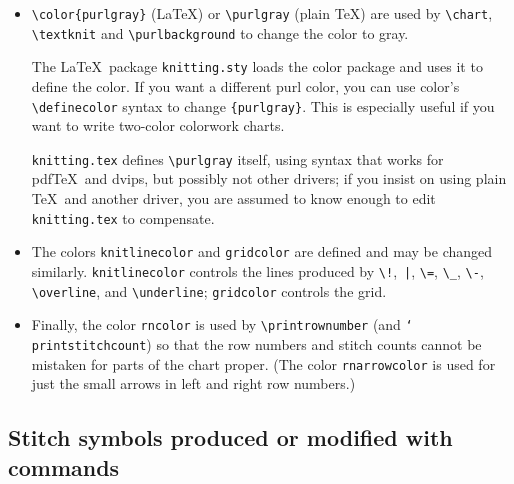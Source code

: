 \documentclass[draft]{amsart}
\begin{document}
\begin{itemize}

\item \verb|\color{purlgray}| (\LaTeX) or \verb|\purlgray| (plain \TeX) are used by \verb|\chart|, \verb|\textknit| and \verb|\purlbackground| to change the color to gray.

The \LaTeX\ package \texttt{knitting.sty} loads the \textsf{color} package and uses it to define the color. If you want a different purl color, you can use \textsf{color}'s \verb|\definecolor| syntax to change \verb|{purlgray}|. This is especially useful if you want to write two-color colorwork charts.

\texttt{knitting.tex} defines \verb|\purlgray| itself, using syntax that works for pdf\/\TeX\ and \textsf{dvips}, but possibly not other drivers; if you insist on using plain \TeX\ and another driver, you are assumed to know enough to edit \texttt{knitting.tex} to compensate. 

\item The colors \texttt{knitlinecolor} and \texttt{gridcolor} are defined and may be changed similarly. \texttt{knitlinecolor} controls the lines produced by \verb?\!?,~\verb?|?, \verb|\=|, \verb|\_|, \verb|\-|, \verb|\overline|, and \verb|\underline|; \texttt{gridcolor} controls the grid.

\item Finally, the color \texttt{rncolor} is used by \verb|\printrownumber| (and \texttt{\char`\\print\-stitch\-count}) so that the row numbers and stitch counts cannot be mistaken for parts of the chart proper. (The color \texttt{rnarrowcolor} is used for just the small arrows in left and right row numbers.)

\end{itemize}

\subsection{Stitch symbols produced or modified with commands}
\end{document}
